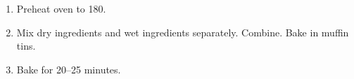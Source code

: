 
\begin{ingredients}
\end{ingredients}


\begin{recipe}
  \begin{enumerate}

  \item Preheat oven to 180\C.

  \item Mix dry ingredients and wet ingredients separately.  Combine.
  Bake in muffin tins.

  \item Bake for 20--25 minutes.

  \end{enumerate}
\end{recipe}
